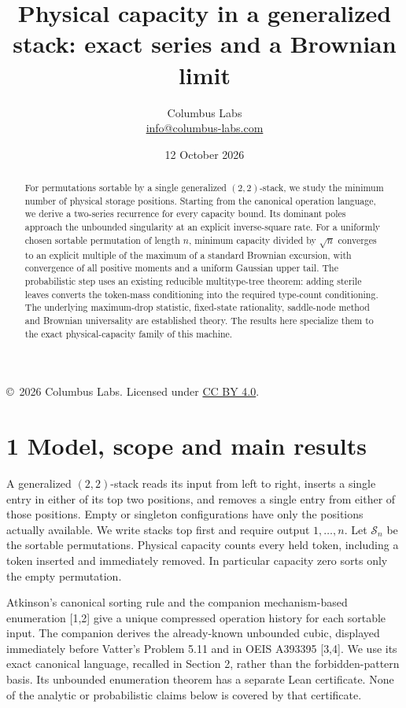 \documentclass[11pt,letterpaper]{article}
\title{Physical capacity in a generalized stack: exact series and a Brownian limit}
\author{Columbus Labs\\\small\href{mailto:info@columbus-labs.com}{info@columbus-labs.com}}
\date{12 October 2026}
\begin{document}
\maketitle
\begin{center}\footnotesize\copyright\ 2026 Columbus Labs. Licensed under \href{https://creativecommons.org/licenses/by/4.0/}{CC BY 4.0}.\end{center}
\vspace{-1em}
\begin{abstract}
For permutations sortable by a single generalized \((2,2)\)-stack, we
study the minimum number of physical storage positions. Starting from
the canonical operation language, we derive a two-series recurrence for
every capacity bound. Its dominant poles approach the unbounded
singularity at an explicit inverse-square rate. For a uniformly chosen
sortable permutation of length \(n\), minimum capacity divided by
\(\sqrt n\) converges to an explicit multiple of the maximum of a
standard Brownian excursion, with convergence of all positive moments
and a uniform Gaussian upper tail. The probabilistic step uses an
existing reducible multitype-tree theorem: adding sterile leaves
converts the token-mass conditioning into the required type-count
conditioning. The underlying maximum-drop statistic, fixed-state
rationality, saddle-node method and Brownian universality are
established theory. The results here specialize them to the exact
physical-capacity family of this machine.
\end{abstract}

\section{1 Model, scope and main
results}\label{model-scope-and-main-results}

A generalized \((2,2)\)-stack reads its input from left to right,
inserts a single entry in either of its top two positions, and removes a
single entry from either of those positions. Empty or singleton
configurations have only the positions actually available. We write
stacks top first and require output \(1,\ldots,n\). Let \(\mathcal S_n\)
be the sortable permutations. Physical capacity counts every held token,
including a token inserted and immediately removed. In particular
capacity zero sorts only the empty permutation.

Atkinson's canonical sorting rule and the companion mechanism-based
enumeration {[}1,2{]} give a unique compressed operation history for
each sortable input. The companion derives the already-known unbounded
cubic, displayed immediately before Vatter's Problem 5.11 and in OEIS
A393395 {[}3,4{]}. We use its exact canonical language, recalled in
Section 2, rather than the forbidden-pattern basis. Its unbounded
enumeration theorem has a separate Lean certificate. None of the
analytic or probabilistic claims below is covered by that certificate.
\end{document}
